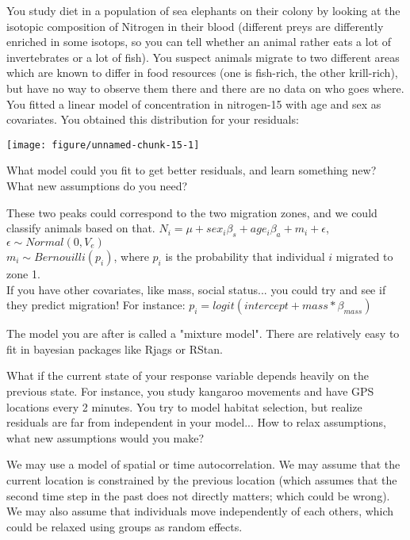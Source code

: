 \documentclass[12pt,a4paper]{scrartcl}\usepackage[]{graphicx}\usepackage[]{color}
\newenvironment{knitrout}{}{} %
\begin{document}
\begin{Exercise}[difficulty=2, title={When something is missing}]
You study diet in a population of sea elephants on their colony by looking at the isotopic composition of Nitrogen in their blood (different preys are differently enriched in some isotops, so you can tell whether an animal rather eats a lot of invertebrates or a lot of fish).
You suspect animals migrate to two different areas which are known to differ in food resources (one is fish-rich, the other krill-rich), but have no way to observe them there and there are no data on who goes where. You fitted a linear model of concentration in nitrogen-15 with age and sex as covariates. You obtained this distribution for your residuals:

\begin{knitrout}
\color{fgcolor}
\texttt{[image: figure/unnamed-chunk-15-1]} 

\end{knitrout}
What model could you fit to get better residuals, and learn something new? What new assumptions do you need?
\end{Exercise}
\begin{Answer}
These two peaks could correspond to the two migration zones, and we could classify animals based on that.
$N_i = \mu + sex_i\beta_s + age_i\beta_a + m_i + \epsilon$, $ \epsilon \sim Normal(0,V_e)$\\
$m_i \sim Bernouilli(p_i)$, where $p_i$ is the probability that individual $i$ migrated to zone 1.\\

If you have other covariates, like mass, social status... you could try and see if they predict migration!
For instance:
$p_i = logit(intercept + mass * \beta_{mass})$

The model you are after is called a "mixture model". There are relatively easy to fit in bayesian packages like Rjags or RStan.
\end{Answer}

\begin{Exercise}[difficulty=2, title={Markovian process}]
What if the current state of your response variable depends heavily on the previous state. For instance, you study kangaroo movements and have GPS locations every 2 minutes. You try to model habitat selection, but realize residuals are far from independent in your model... How to relax assumptions, what new assumptions would you make?
\end{Exercise}
\begin{Answer}
We may use a model of spatial or time autocorrelation. We may assume that the current location is constrained by the previous location (which assumes that the second time step in the past does not directly matters; which could be wrong). We may also assume that individuals move independently of each others, which could be relaxed using groups as random effects.
\end{Answer}
\end{document}
